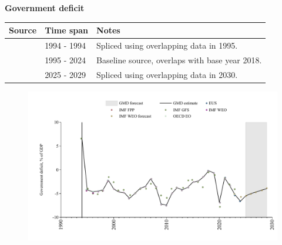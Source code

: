 \documentclass[12pt,a4paper,landscape]{article}
\begin{document}
\begin{adjustbox}{max totalsize={\paperwidth}{\paperheight},center}
\begin{minipage}[t][\textheight][t]{\textwidth}
\vspace*{0.5cm}
{}
\begin{center}
{\Large\bfseries Government deficit}
\end{center}
\vspace{0.5cm}
\begin{table}[H]
\centering
\small
\begin{tabular}{|l|l|l|}
\hline
\textbf{Source} & \textbf{Time span} & \textbf{Notes} \\
\hline
\rowcolor{white}\cite{IMF_GFS}& 1994 - 1994 &Spliced using overlapping data in 1995. \\
\rowcolor{lightgray}\cite{EUS}& 1995 - 2024 &Baseline source, overlaps with base year 2018. \\
\rowcolor{white}\cite{IMF_WEO_forecast}& 2025 - 2029 &Spliced using overlapping data in 2030. \\
\hline
\end{tabular}
\end{table}
\begin{figure}[H]
\centering
\includegraphics[width=\textwidth,height=0.6\textheight,keepaspectratio]{graphs/POL_govdef_GDP.pdf}
\end{figure}
\end{minipage}
\end{adjustbox}
\end{document}
